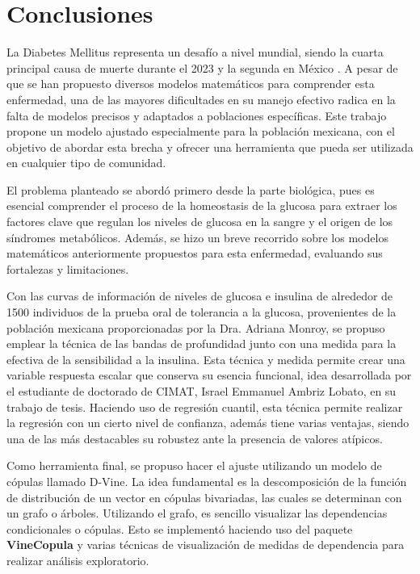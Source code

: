 \chapter{Conclusiones}

La Diabetes Mellitus representa un desafío a nivel mundial, siendo la cuarta principal causa de muerte durante el 2023 y la segunda en México \cite{INEGI}. A pesar de que se han propuesto diversos modelos matemáticos para comprender esta enfermedad, una de las mayores dificultades en su manejo efectivo radica en la falta de modelos precisos y adaptados a poblaciones específicas. Este trabajo propone un modelo ajustado especialmente para la población mexicana, con el objetivo de abordar esta brecha y ofrecer una herramienta que pueda ser utilizada en cualquier tipo de comunidad.

El problema planteado se abordó primero desde la parte biológica, pues es esencial comprender el proceso de la homeostasis de la glucosa para extraer los factores clave que regulan los niveles de glucosa en la sangre y el origen de los síndromes metabólicos. Además, se hizo un breve recorrido sobre los modelos matemáticos anteriormente propuestos para esta enfermedad, evaluando sus fortalezas y limitaciones.

Con las curvas de información de niveles de glucosa e insulina de alrededor de 1500 individuos de la prueba oral de tolerancia a la glucosa, provenientes de la población mexicana proporcionadas por la Dra. Adriana Monroy, se propuso emplear la técnica de las bandas de profundidad junto con una medida para la efectiva de la sensibilidad a la insulina. Esta técnica y medida permite crear una variable respuesta escalar que conserva su esencia funcional, idea desarrollada por el estudiante de doctorado de CIMAT, Israel Emmanuel Ambriz Lobato, en su trabajo de tesis. Haciendo uso de regresión cuantil, esta técnica permite realizar la regresión con un cierto nivel de confianza, además tiene varias ventajas, siendo una de las más destacables su robustez ante la presencia de valores atípicos.

Como herramienta final, se propuso hacer el ajuste utilizando un modelo de cópulas llamado D-Vine. La idea fundamental es la descomposición de la función de distribución de un vector en cópulas bivariadas, las cuales se determinan con un grafo o árboles. Utilizando el grafo, es sencillo visualizar las dependencias condicionales o cópulas. Esto se implementó haciendo uso del paquete \textbf{VineCopula} y varias técnicas de visualización de medidas de dependencia para realizar análisis exploratorio.

